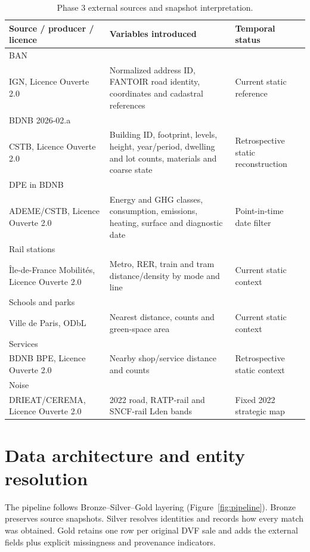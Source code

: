 \documentclass[11pt,a4paper]{article}
\begin{document}
\begin{table}[H]
\centering
\caption{Phase 3 external sources and snapshot interpretation.}
\label{tab:sources}
\footnotesize
\begin{tabularx}{\textwidth}{p{3.05cm}X p{3.25cm}}
\toprule
Source / producer / licence & Variables introduced & Temporal status \\
\midrule
BAN \cite{ban}\\IGN, Licence Ouverte 2.0 & Normalized address ID, FANTOIR road identity, coordinates and cadastral references & Current static reference \\
BDNB 2026-02.a \cite{bdnb}\\CSTB, Licence Ouverte 2.0 & Building ID, footprint, levels, height, year/period, dwelling and lot counts, materials and coarse state & Retrospective static reconstruction \\
DPE in BDNB \cite{dpe}\\ADEME/CSTB, Licence Ouverte 2.0 & Energy and GHG classes, consumption, emissions, heating, surface and diagnostic date & Point-in-time date filter \\
Rail stations \cite{idfm}\\\^Ile-de-France Mobilit\'es, Licence Ouverte 2.0 & Metro, RER, train and tram distance/density by mode and line & Current static context \\
Schools and parks \cite{paris}\\Ville de Paris, ODbL & Nearest distance, counts and green-space area & Current static context \\
Services\\BDNB BPE, Licence Ouverte 2.0 & Nearby shop/service distance and counts & Retrospective static context \\
Noise \cite{noise}\\DRIEAT/CEREMA, Licence Ouverte 2.0 & 2022 road, RATP-rail and SNCF-rail Lden bands & Fixed 2022 strategic map \\
\bottomrule
\end{tabularx}
\end{table}

\section{Data architecture and entity resolution}

The pipeline follows Bronze--Silver--Gold layering (Figure~\ref{fig:pipeline}).
Bronze preserves source snapshots. Silver resolves identities and records how
every match was obtained. Gold retains one row per original DVF sale and adds
the external fields plus explicit missingness and provenance indicators.
\end{document}
